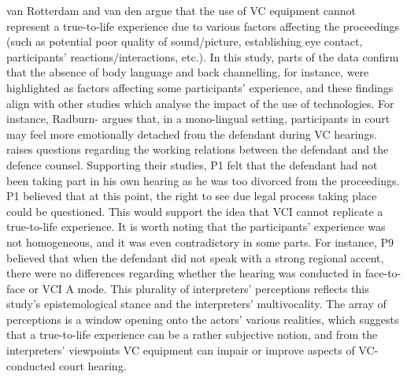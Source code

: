 \documentclass[output=paper]{langsci/langscibook}
\begin{document}
van Rotterdam and van den \citet{Hoogen2011} argue that the use of VC equipment cannot represent a true-to-life experience due to various factors affecting the proceedings (such as potential poor quality of sound/picture, establishing eye contact, participants’ reactions/interactions, etc.). In this study, parts of the data confirm that the absence of body language and back channelling, for instance, were highlighted as factors affecting some participants’ experience, and these findings align with other studies which analyse the impact of the use of technologies. For instance, Radburn-\citet{Remfry1994} argues that, in a mono-lingual setting, participants in court may feel more emotionally detached from the defendant during VC hearings. \citet{Hodges2008} raises questions regarding the working relations between the defendant and the defence counsel. Supporting their studies, P1 felt that the defendant had not been taking part in his own hearing as he was too divorced from the proceedings. P1 believed that at this point, the right to see due legal process taking place could be questioned. This would support the idea that VCI cannot replicate a true-to-life experience. It is worth noting that the participants’ experience was not homogeneous, and it was even contradictory in some parts. For instance, P9 believed that when the defendant did not speak with a strong regional accent, there were no differences regarding whether the hearing was conducted in face-to-face or VCI A mode. This plurality of interpreters’ perceptions reflects this study’s epistemological stance and the interpreters’ multivocality. The array of perceptions is a window opening onto the actors’ various realities, which suggests that a true-to-life experience can be a rather subjective notion, and from the interpreters’ viewpoints VC equipment can impair or improve aspects of VC-conducted court hearing.
\end{document}
